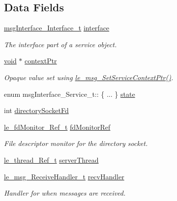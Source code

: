 \subsection*{Data Fields}
\begin{DoxyCompactItemize}
\item 
\hyperlink{structmsg_interface___interface__t}{msg\+Interface\+\_\+\+Interface\+\_\+t} \hyperlink{structmsg_interface___service__t_ab0defc7b2d79313cefe6293c50cdffb2}{interface}
\begin{DoxyCompactList}\small\item\em The interface part of a service object. \end{DoxyCompactList}\item 
\hyperlink{_t_e_m_p_l_a_t_e__cdef_8h_ac9c84fa68bbad002983e35ce3663c686}{void} $\ast$ \hyperlink{structmsg_interface___service__t_a0fc576ecc663bb71bfd54b22fdeb32c6}{context\+Ptr}
\begin{DoxyCompactList}\small\item\em Opaque value set using \hyperlink{le__messaging_8h_a9233d283c260a1983c594b4a9061374a}{le\+\_\+msg\+\_\+\+Set\+Service\+Context\+Ptr()}. \end{DoxyCompactList}\item 
enum msg\+Interface\+\_\+\+Service\+\_\+t\+:: \{ ... \}  \hyperlink{structmsg_interface___service__t_a4bfc3b696b2c37277f13395e49b10868}{state}
\item 
int \hyperlink{structmsg_interface___service__t_ada59f927efc70ba333c71437003186d5}{directory\+Socket\+Fd}
\item 
\hyperlink{le__fd_monitor_8h_a85048556f0b95147af81e76907895d42}{le\+\_\+fd\+Monitor\+\_\+\+Ref\+\_\+t} \hyperlink{structmsg_interface___service__t_a0e41c9fe5191e934c466d43b09d7b2ba}{fd\+Monitor\+Ref}
\begin{DoxyCompactList}\small\item\em File descriptor monitor for the directory socket. \end{DoxyCompactList}\item 
\hyperlink{le__thread_8h_a32121104c6b4ca39008eb79a4d6862f2}{le\+\_\+thread\+\_\+\+Ref\+\_\+t} \hyperlink{structmsg_interface___service__t_a0ae89607e7db7ef4a58b4e3973328c32}{server\+Thread}
\item 
\hyperlink{le__messaging_8h_a9aa36465329fb00e85fb3cbdf034298a}{le\+\_\+msg\+\_\+\+Receive\+Handler\+\_\+t} \hyperlink{structmsg_interface___service__t_a23b44957bb235bf02c52c09884905113}{recv\+Handler}
\begin{DoxyCompactList}\small\item\em Handler for when messages are received. \end{DoxyCompactList}\item 

\end{DoxyCompactItemize}
